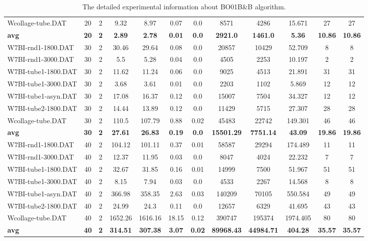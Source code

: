 \begin{table}[!h]
{\begin{tabular}{lccccccccccc}
Wcollage-tube.DAT & 20 & 2 & 9.32 & 8.97 & 0.07 & 0.0 & 8571 & 4286 & 15.671 & 27 & 27\\
\cline{1-12} \textbf{avg} & \textbf{20} & \textbf{2} & \textbf{2.89} & \textbf{2.78} & \textbf{0.01} & \textbf{0.0} & \textbf{2921.0} & \textbf{1461.0} & \textbf{5.36} & \textbf{10.86} & \textbf{10.86} \\ \cline{1-12}
W7BI-rnd1-1800.DAT & 30 & 2 & 30.46 & 29.64 & 0.08 & 0.0 & 20857 & 10429 & 52.709 & 8 & 8\\
W7BI-rnd1-3000.DAT & 30 & 2 & 5.5 & 5.28 & 0.04 & 0.0 & 4505 & 2253 & 10.197 & 2 & 2\\
W7BI-tube1-1800.DAT & 30 & 2 & 11.62 & 11.24 & 0.06 & 0.0 & 9025 & 4513 & 21.891 & 31 & 31\\
W7BI-tube1-3000.DAT & 30 & 2 & 3.68 & 3.61 & 0.01 & 0.0 & 2203 & 1102 & 5.869 & 12 & 12\\
W7BI-tube1-asyn.DAT & 30 & 2 & 17.08 & 16.37 & 0.12 & 0.0 & 15007 & 7504 & 34.327 & 12 & 12\\
W7BI-tube2-1800.DAT & 30 & 2 & 14.44 & 13.89 & 0.12 & 0.0 & 11429 & 5715 & 27.307 & 28 & 28\\
Wcollage-tube.DAT & 30 & 2 & 110.5 & 107.79 & 0.88 & 0.02 & 45483 & 22742 & 149.301 & 46 & 46\\
\cline{1-12} \textbf{avg} & \textbf{30} & \textbf{2} & \textbf{27.61} & \textbf{26.83} & \textbf{0.19} & \textbf{0.0} & \textbf{15501.29} & \textbf{7751.14} & \textbf{43.09} & \textbf{19.86} & \textbf{19.86} \\ \cline{1-12}
W7BI-rnd1-1800.DAT & 40 & 2 & 104.12 & 101.11 & 0.37 & 0.01 & 58587 & 29294 & 174.489 & 11 & 11\\
W7BI-rnd1-3000.DAT & 40 & 2 & 12.37 & 11.95 & 0.03 & 0.0 & 8047 & 4024 & 22.232 & 7 & 7\\
W7BI-tube1-1800.DAT & 40 & 2 & 32.67 & 31.85 & 0.16 & 0.01 & 14999 & 7500 & 51.967 & 51 & 51\\
W7BI-tube1-3000.DAT & 40 & 2 & 8.15 & 7.94 & 0.03 & 0.0 & 4533 & 2267 & 14.568 & 8 & 8\\
W7BI-tube1-asyn.DAT & 40 & 2 & 366.98 & 358.35 & 2.63 & 0.03 & 140209 & 70105 & 550.584 & 49 & 49\\
W7BI-tube2-1800.DAT & 40 & 2 & 24.99 & 24.3 & 0.11 & 0.0 & 12657 & 6329 & 41.695 & 43 & 43\\
Wcollage-tube.DAT & 40 & 2 & 1652.26 & 1616.16 & 18.15 & 0.12 & 390747 & 195374 & 1974.405 & 80 & 80\\
\cline{1-12} \textbf{avg} & \textbf{40} & \textbf{2} & \textbf{314.51} & \textbf{307.38} & \textbf{3.07} & \textbf{0.02} & \textbf{89968.43} & \textbf{44984.71} & \textbf{404.28} & \textbf{35.57} & \textbf{35.57} \\ \cline{1-12}
\bottomrule
\end{tabular}%
}%
\caption{The detailed experimental information about BO01B\&B algorithm.}
\label{tab:table_bb}
\end{table}

